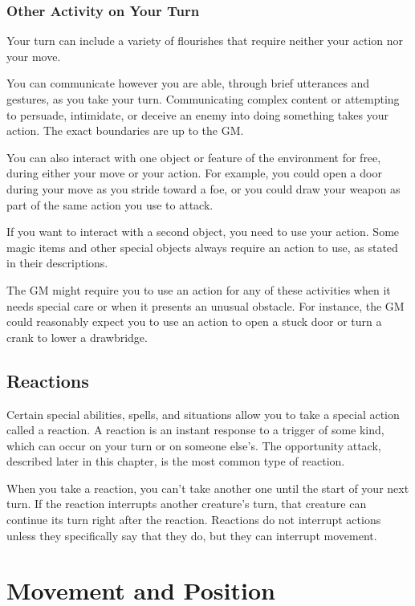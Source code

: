 \subsubsection{Other Activity on Your Turn}

Your turn can include a variety of flourishes that require neither your action nor your move.

You can communicate however you are able, through brief utterances and gestures, as you take your turn. Communicating complex content or attempting to persuade, intimidate, or deceive an enemy into doing something takes your action. The exact boundaries are up to the GM.

You can also interact with one object or feature of the environment for free, during either your move or your action. For example, you could open a door during your move as you stride toward a foe, or you could draw your weapon as part of the same action you use to attack.

If you want to interact with a second object, you need to use your action. Some magic items and other special objects always require an action to use, as stated in their descriptions.

The GM might require you to use an action for any of these activities when it needs special care or when it presents an unusual obstacle. For instance, the GM could reasonably expect you to use an action to open a stuck door or turn a crank to lower a drawbridge.

\subsection{Reactions}

Certain special abilities, spells, and situations allow you to take a special action called a reaction. A reaction is an instant response to a trigger of some kind, which can occur on your turn or on someone else's. The opportunity attack, described later in this chapter, is the most common type of reaction.

When you take a reaction, you can't take another one until the start of your next turn. If the reaction interrupts another creature's turn, that creature can continue its turn right after the reaction. Reactions do not interrupt actions unless they specifically say that they do, but they can interrupt movement.

\section{Movement and Position}
\label{sec:movement-and-position}

